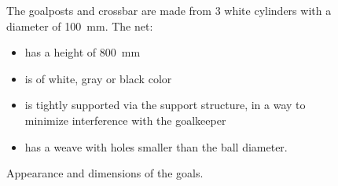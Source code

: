 \begin{figure}[h!]
\begin{center}
\leavevmode
\begin{minipage}[t]{0.49\columnwidth}
%
\end{minipage}
\begin{minipage}[t]{0.49\columnwidth}
The goalposts and crossbar are made from 3 white cylinders with a diameter of \qty{100}{\milli\metre}.
The net:
\begin{itemize}
\item has a height of \qty{800}{\milli\metre}
\item is of white, gray or black color
\item is tightly supported via the support structure, in a way to minimize interference with the goalkeeper
\item has a weave with holes smaller than the ball diameter.
\end{itemize}
\end{minipage}
\caption{Appearance and dimensions of the goals.}
\label{fig:goal_appearance}
\end{center}
\end{figure}

